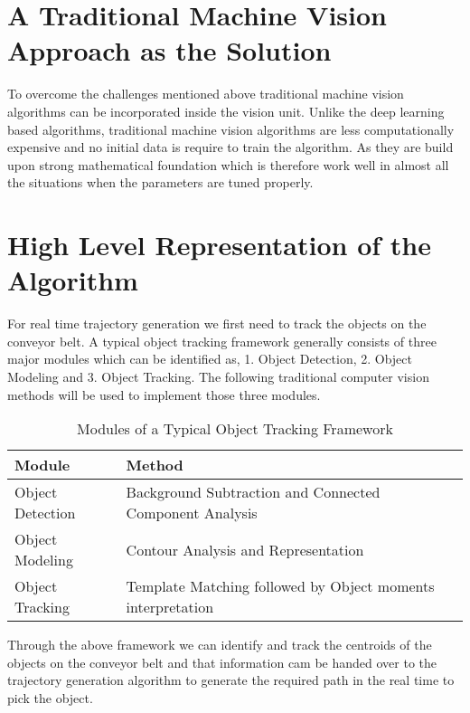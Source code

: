 \documentclass[a4paper,12pt]{book}%
\begin{document}
\section{A Traditional Machine Vision Approach as the Solution}

To overcome the challenges mentioned above traditional machine vision algorithms can be incorporated inside the vision unit. Unlike the deep learning based algorithms, traditional machine vision algorithms  are less computationally expensive and no initial data is require to train the algorithm. As they are build upon strong mathematical foundation which is therefore work well in almost all the situations when the parameters are tuned properly.

\section{High Level Representation of the Algorithm}

For real time trajectory generation we first need to track the objects on the conveyor belt. A typical object tracking framework generally consists of three major modules which can be identified as, 1. Object Detection, 2. Object Modeling and 3. Object Tracking. The following traditional computer vision methods will be used to implement those three modules.\\

\begin{table}[!h]
	\centering
	\begin{tabular}[!h]{|l | l|}
		\hline
		\textbf{Module} & \textbf{Method}\\
		\hline
		Object Detection &  Background Subtraction and Connected Component Analysis\\
		Object Modeling & Contour Analysis and Representation\\
		Object Tracking & Template Matching followed by Object moments interpretation\\ 
		\hline\hline
	\end{tabular}
\caption{Modules of a Typical Object Tracking Framework}
\end{table}
	
%
%

Through the above framework we can identify and track the centroids of the objects on the conveyor belt and that information cam be handed over to the trajectory generation algorithm to generate the required path in the real time  to pick the object.
%
%

\end{document}
